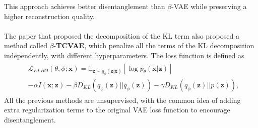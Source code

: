 This approach achieves better disentanglement than $\beta$-VAE while preserving a higher reconstruction quality. \\
\\
The paper that proposed the decomposition of the KL term \cite{chen2019isolatingsourcesdisentanglementvariational} also proposed a method called $\beta$-\textbf{TCVAE}, which penalize 
all the terms of the KL decomposition independently, with different hyperparameters. The loss function is defined as
\begin{align}
\begin{split}
   &\mathcal{L}_{ELBO}(\theta, \phi; \mathbf{x}) = \mathbb{E}_{\mathbf{z}\sim q_{\phi}(\mathbf{z}|\mathbf{x})}\left[\log p_{\theta}(\mathbf{x}|\mathbf{z})\right] \\
   & - \alpha I(\mathbf{x};\mathbf{z}) - \beta D_{KL}(q_{\phi}(\mathbf{z})||\bar q_{\phi}(\mathbf{z})) - \gamma D_{KL}(q_{\phi}(\mathbf{z})||p(\mathbf{z})),
\end{split}
\end{align}
All the previous methods are unsupervised, with the common idea of adding extra regularization terms to the original VAE loss function to encourage disentanglement.  


